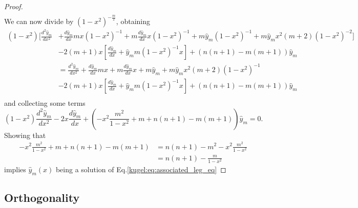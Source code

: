 \begin{proof}
\begin{align*}
    \end{align*}
    We can now divide by $(1-x^2)^{-\frac{m}{2}}$, obtaining
    \begin{align*}
    (1-x^2)\biggl[\frac{d^2\hat{y}_m}{dx^2} &+ \frac{d\hat{y}_m}{dx}mx (1-x^2)^{-1} + m\frac{d\hat{y}_m}{dx}x (1-x^2)^{-1} + m\hat{y}_m  (1-x^2)^{-1} + m\hat{y}_m x^2(m+2)(1-x^2)^{-2}\biggr] \\
    &-2(m+1)x\left[  \frac{d\hat{y}_m}{dx} + \hat{y}_mm(1-x^2)^{-1}x \right] + (n(n+1)-m(m+1))\hat{y}_m\\
    &= \frac{d^2\hat{y}_m}{dx^2} + \frac{d\hat{y}_m}{dx}mx + m\frac{d\hat{y}_m}{dx}x + m\hat{y}_m + m\hat{y}_m x^2(m+2)(1-x^2)^{-1} \\
    &-2(m+1)x\left[  \frac{d\hat{y}_m}{dx} + \hat{y}_mm(1-x^2)^{-1}x \right] + (n(n+1)-m(m+1))\hat{y}_m\\
    \end{align*}
    and collecting some terms
    \begin{equation*}
    (1-x^2)\frac{d^2\hat{y}_m}{dx^2} - 2x\frac{d\hat{y}_m}{dx} + \left( -x^2 \frac{m^2}{1-x^2} + m+n(n+1)-m(m+1)\right)\hat{y}_m=0.
    \end{equation*}
    Showing that 
    \begin{align*}
    -x^2 \frac{m^2}{1-x^2} + m+n(n+1)-m(m+1) &= n(n+1)- m^2 -x^2 \frac{m^2}{1-x^2} \\
    &= n(n+1)- \frac{m}{1-x^2}
    \end{align*}
    implies $\hat{y}_m(x)$ being a solution of Eq.\eqref{kugel:eq:associated_leg_eq}
\end{proof}

\subsection{Orthogonality}
